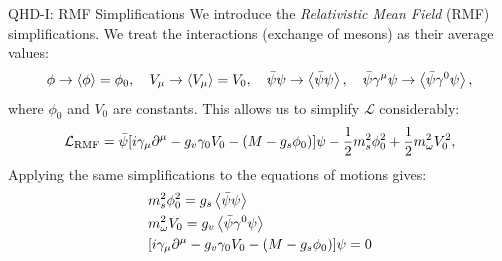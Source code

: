 \documentclass[handout]{beamer}
\newcommand{\Letter}[1]{\mathcal{#1}}
\newcommand{\Lag}{\Letter{L}}
\newcommand{\p}{\partial}
\begin{document}
    \begin{frame}{QHD-I: RMF Simplifications}
        We introduce the \textit{Relativistic Mean Field} (RMF) simplifications. \pause We treat the interactions (exchange of mesons) as their average values: \pause
        \[\phi \to \expval{\phi} = \phi_0, \quad V_\mu \to \expval{V_\mu} = V_0, \quad \bar\psi\psi \to \expval{\bar\psi\psi}, \quad \bar\psi\gamma^\mu\psi \to \expval{\bar\psi \gamma^0\psi},\]
        where $\phi_0$ and $V_0$ are constants. \pause This allows us to simplify $\Lag$ considerably: \pause
        \begin{align*}
            \Lag_\text{RMF} = \bar\psi \bqty{i\gamma_\mu\p^\mu - g_v \gamma_0 V_0 - (M-g_s\phi_0)} \psi - \frac{1}{2} m_s^2 \phi_0^2 + \frac{1}{2} m_\omega^2 V_0^2,
        \end{align*} \pause
        Applying the same simplifications to the equations of motions gives:
        \begin{align*}
            & m_s^2 \phi_0^2 = g_s\expval{\bar\psi\psi}\\
            & m_\omega^2 V_0 = g_v\expval{\bar\psi\gamma^0\psi}\\
            & \bqty{i\gamma_\mu\p^\mu - g_v\gamma_0 V_0 - (M - g_s\phi_0)}\psi = 0\\
        \end{align*}

    \end{frame}
\end{document}
